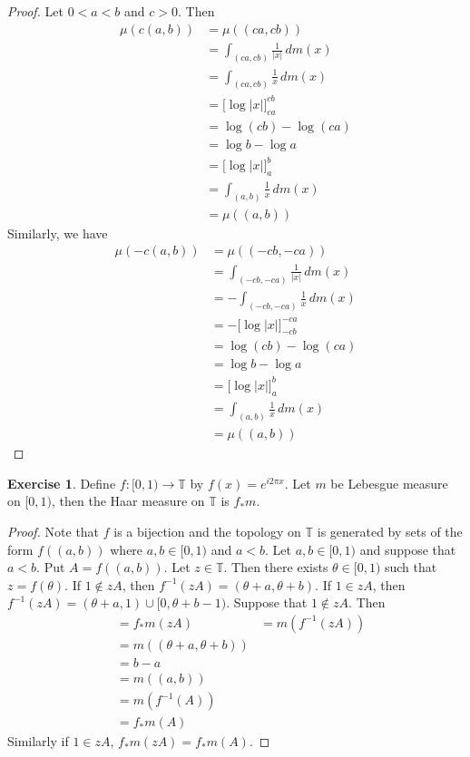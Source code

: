 \documentclass{book}
\theoremstyle{definition}
\newtheorem{ex}[definition]{Exercise}
\newcommand{\T}{\mathbb{T}}
\newcommand{\lex}[1]{\label{ex:#1}}
\DeclareMathOperator*{\0}{\mbf{0}}
\DeclareMathOperator*{\1}{\mbf{1}}
\newcommand{\dm}{\, d m}
\begin{document}
	\begin{proof}
		Let $0 < a < b$ and $c >0$. Then
		\begin{align*}
			\mu(c(a, b))
			& = \mu((ca,cb)) \\
			& = \int_{(ca,cb)} \frac{1}{|x|} \dm(x)\\
			& = \int_{(ca,cb)} \frac{1}{x} \dm(x)\\
			& = \bigg[ \log|x| \bigg]_{ca}^{cb} \\
			& = \log(cb) - \log(ca) \\
			& = \log b - \log a \\
			& = \bigg[ \log|x| \bigg]_{a}^{b} \\ 
			& =  \int_{(a,b)} \frac{1}{x} \dm(x)\\
			& = \mu((a,b))
		\end{align*}
	Similarly, we have
	\begin{align*}
		\mu(-c(a, b))
		& = \mu((-cb,-ca)) \\
		& = \int_{(-cb,-ca)} \frac{1}{|x|} \dm(x)\\
		& = - \int_{(-cb,-ca)} \frac{1}{x} \dm(x)\\
		& = - \bigg[ \log|x| \bigg]_{-cb}^{-ca} \\
		& = \log(cb) - \log(ca) \\
		& = \log b - \log a \\
		& = \bigg[ \log|x| \bigg]_{a}^{b} \\ 
		& =  \int_{(a,b)} \frac{1}{x} \dm(x)\\
		& = \mu((a,b))
	\end{align*}
	\end{proof}

	\begin{ex} \lex{00000} 
		Define $f: [ 0,1) \rightarrow \T$ by $f(x) = e^{i2 \pi x}$. Let $m$ be Lebesgue measure on $[0,1)$, then the Haar measure on $\T$ is $f_*m$.
	\end{ex}

	\begin{proof}
		Note that $f$ is a bijection and the topology on $\T$ is generated by sets of the form $f((a, b))$ where $a,b \in [0,1)$ and $a< b$. Let $a,b \in [ 0,1 )$ and suppose that $a<b$. Put $A = f((a, b))$. Let $z \in \T$. Then there exists $\theta \in [0, 1)$ such that $z = f(\theta)$. If $1 \not \in zA$, then $f^{-1}(zA) = (\theta + a, \theta + b)$. If $1 \in zA$, then $f^{-1}(zA) = (\theta + a , 1) \cup [0,  \theta + b - 1)$. Suppose that $1 \not \in zA$. Then
		\begin{align*}
			& = f_*m(zA) 
			& = m(f^{-1}(zA)) \\
			& = m((\theta + a, \theta + b)) \\
			& = b - a \\
			& = m((a,b)) \\
			& = m(f^{-1}(A)) \\
			& = f_*m(A)
		\end{align*}
	Similarly if $1 \in zA$, $f_*m(zA) = f_*m(A)$.
	\end{proof} 
\end{document}
